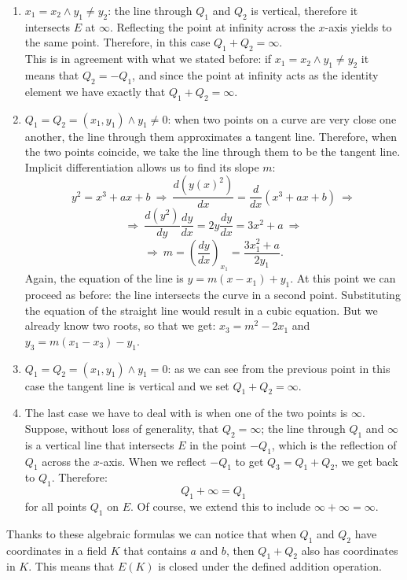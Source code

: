 \begin{enumerate}
	\item $x_1 = x_2 \wedge y_1 \neq y_2$: the line through $Q_1$ and $Q_2$ is vertical, therefore it intersects $E$ at $\infty$. Reflecting the point at infinity across the $x$-axis yields to the same point. Therefore, in this case $Q_1 + Q_2 = \infty$. 
	\\
	This is in agreement with what we stated before: if  $x_1 = x_2 \wedge y_1 \neq y_2$ it means that $Q_2 = -Q_1$, and since the point at infinity acts as the identity element we have exactly that $Q_1 + Q_2 = \infty$.
	
	\item $Q_1 = Q_2 = (x_1, y_1) \wedge y_1 \neq 0$: when two points on a curve are very close one another, the line through them approximates a tangent line. Therefore, when the two points coincide, we take the line through them to be the tangent line. Implicit differentiation allows us to find its slope $m$:
	$$y^2 = x^3 + ax + b \ \Longrightarrow \ \frac{d(y(x)^2)}{dx} = \frac{d}{dx}(x^3 + ax + b) \ \Longrightarrow$$
	$$ \Longrightarrow \ \frac{d(y^2)}{dy}\frac{dy}{dx}=2y\frac{dy}{dx}= 3x^2 + a \ \Longrightarrow $$ 
	$$\Longrightarrow \ m = \left(\frac{dy}{dx}\right)_{x_1} = \frac{3x_1^2 + a}{2y_1}.$$
	Again, the equation of the line is $y = m(x - x_1) + y_1$. At this point we can proceed as before: the line intersects the curve in a second point. Substituting the equation of the straight line would result in a cubic equation. But we already know two roots, so that we get: $x_3 = m^2 - 2x_1$ and $y_3 = m(x_1 - x_3) - y_1$.
	\\
	\item $Q_1 = Q_2 = (x_1, y_1) \wedge y_1 = 0$: as we can see from the previous point in this case the tangent line is vertical and we set $Q_1 + Q_2 = \infty$.
	\item The last case we have to deal with is when one of the two points is $\infty$. Suppose, without loss of generality, that $Q_2 = \infty$; the line through $Q_1$ and $\infty$ is a vertical line that intersects $E$ in the point $-Q_1$, which is the reflection of $Q_1$ across the $x$-axis. When we reflect $-Q_1$ to get $Q_3 = Q_1 + Q_2$, we get back to $Q_1$. Therefore:
	 $$Q_1 + \infty = Q_1$$
	for all points $Q_1$ on $E$. Of course, we extend this to include $\infty + \infty = \infty$.
\end{enumerate}
Thanks to these algebraic formulas we can notice that when $Q_1$ and $Q_2$ have coordinates in a field $K$ that contains $a$ and $b$, then $Q_1 + Q_2$ also has coordinates in $K$. This means that $E(K)$ is closed under the defined addition operation.

